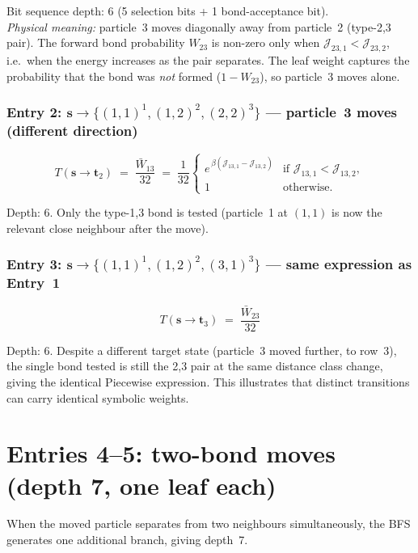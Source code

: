 \documentclass[11pt,a4paper]{article}
\newcommand{\J}[2]{\mathcal{J}_{#1,#2}}
\newcommand{\W}[1]{W_{#1}}
\newcommand{\Wb}[1]{\bar{W}_{#1}}
\newcommand{\s}{\mathbf{s}}
\newcommand{\tp}{\mathbf{t}}
\begin{document}
Bit sequence depth: 6 (5 selection bits + 1 bond-acceptance bit).\\
\textit{Physical meaning:} particle~3 moves diagonally away from particle~2
(type-2,3 pair). The forward bond probability $\W{23}$ is non-zero only when
$\J{23}{1}<\J{23}{2}$, i.e.\ when the energy increases as the pair separates.
The leaf weight captures the probability that the bond was \emph{not} formed
($1-\W{23}$), so particle~3 moves alone.

\subsubsection*{Entry 2: $\s\to\{(1,1)^1,(1,2)^2,(2,2)^3\}$
  --- particle~3 moves (different direction)}

\[
  T(\s\to\tp_2) \;=\; \frac{\Wb{13}}{32}
  \;=\;
  \frac{1}{32}
  \begin{cases}
    e^{\,\beta(\J{13}{1}-\J{13}{2})} & \text{if } \J{13}{1}<\J{13}{2},\\
    1 & \text{otherwise.}
  \end{cases}
\]

Depth: 6.  Only the type-1,3 bond is tested (particle~1 at $(1,1)$ is now
the relevant close neighbour after the move).

\subsubsection*{Entry 3: $\s\to\{(1,1)^1,(1,2)^2,(3,1)^3\}$
  --- same expression as Entry~1}

\[
  T(\s\to\tp_3) \;=\; \frac{\Wb{23}}{32}
\]

Depth: 6.  Despite a different target state (particle~3 moved further, to
row~3), the single bond tested is still the 2,3 pair at the same distance
class change, giving the identical Piecewise expression.  This illustrates
that distinct transitions can carry identical symbolic weights.

\section{Entries 4--5: two-bond moves (depth 7, one leaf each)}

When the moved particle separates from two neighbours simultaneously,
the BFS generates one additional branch, giving depth~7.
\end{document}
